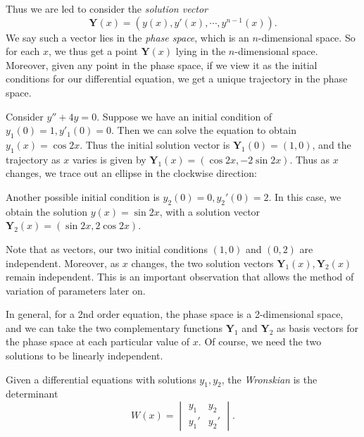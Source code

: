 \documentclass[a4paper]{article}
\begin{document}
Thus we are led to consider the \emph{solution vector}
\[
  \mathbf{Y}(x) = (y(x), y'(x), \cdots , y^{n - 1}(x)).
\]
We say such a vector lies in the \emph{phase space}, which is an $n$-dimensional space. So for each $x$, we thus get a point $\mathbf{Y}(x)$ lying in the $n$-dimensional space. Moreover, given any point in the phase space, if we view it as the initial conditions for our differential equation, we get a unique trajectory in the phase space.

\begin{eg}
  Consider $y'' + 4y = 0$. Suppose we have an initial condition of $y_1(0) = 1, y'_1(0) = 0$. Then we can solve the equation to obtain $y_1(x) = \cos 2x$. Thus the initial solution vector is $\mathbf{Y}_1(0) = (1, 0)$, and the trajectory as $x$ varies is given by $\mathbf{Y}_1(x) = (\cos 2x, -2 \sin 2x)$. Thus as $x$ changes, we trace out an ellipse in the clockwise direction:
   \begin{center}
  \end{center}
  Another possible initial condition is $y_2(0) = 0, y_2'(0) = 2$. In this case, we obtain the solution $y(x) = \sin 2x$, with a solution vector $\mathbf{Y}_2(x) = (\sin 2x, 2 \cos 2x)$.

  Note that as vectors, our two initial conditions $(1, 0)$ and $(0, 2)$ are independent. Moreover, as $x$ changes, the two solution vectors $\mathbf{Y}_1(x), \mathbf{Y}_2(x)$ remain independent. This is an important observation that allows the method of variation of parameters later on.
\end{eg}

In general, for a 2nd order equation, the phase space is a 2-dimensional space, and we can take the two complementary functions $\mathbf{Y}_1$ and $\mathbf{Y}_2$ as basis vectors for the phase space at each particular value of $x$. Of course, we need the two solutions to be linearly independent.

\begin{defi}[Wronskian]
  Given a differential equations with solutions $y_1, y_2$, the \emph{Wronskian} is the determinant
  \[
    W(x) = \begin{vmatrix}y_1 & y_2 \\ y_1' & y_2'\end{vmatrix}.
  \]
\end{defi}
\end{document}
